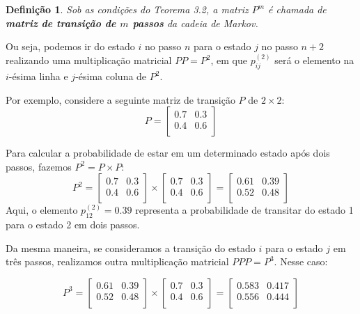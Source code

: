 \documentclass[12pt, a4paper, openany]{book}
\numberwithin{equation}{chapter}
\numberwithin{table}{chapter}
\numberwithin{figure}{chapter}
\theoremstyle{break}
\newtheorem{definition}{Defini\c{c}\~ao}[section]
\begin{document}
\begin{definition}
Sob as condições do Teorema 3.2, a matriz \( P^m \) é chamada de \textbf{matriz de transição de \( m \) passos} da cadeia de Markov.
\end{definition}

Ou seja, podemos ir do estado \( i \) no passo \( n \) para o estado \( j \) no passo \( n+2 \) realizando uma multiplicação matricial \( PP = P^2 \), em que \( p_{ij}^{(2)} \) será o elemento na \( i \)-ésima linha e \( j \)-ésima coluna de \( P^2 \). 

Por exemplo, considere a seguinte matriz de transição \( P \) de \( 2 \times 2 \):
\[
P = \begin{bmatrix}
0.7 & 0.3 \\
0.4 & 0.6 \\
\end{bmatrix}
\]

Para calcular a probabilidade de estar em um determinado estado após dois passos, fazemos \( P^2 = P \times P \):
\[
P^2 = \begin{bmatrix}
0.7 & 0.3 \\
0.4 & 0.6 \\
\end{bmatrix}
\times
\begin{bmatrix}
0.7 & 0.3 \\
0.4 & 0.6 \\
\end{bmatrix}
= \begin{bmatrix}
0.61 & 0.39 \\
0.52 & 0.48 \\
\end{bmatrix}
\]
Aqui, o elemento \( p_{12}^{(2)} = 0.39 \) representa a probabilidade de transitar do estado 1 para o estado 2 em dois passos.

Da mesma maneira, se consideramos a transição do estado \( i \) para o estado \( j \) em três passos, realizamos outra multiplicação matricial \( PPP = P^3 \). Nesse caso:

\[
P^3 = \begin{bmatrix}
0.61 & 0.39 \\
0.52 & 0.48 \\
\end{bmatrix}
\times
\begin{bmatrix}
0.7 & 0.3 \\
0.4 & 0.6 \\
\end{bmatrix}
= \begin{bmatrix}
0.583 & 0.417 \\
0.556 & 0.444 \\
\end{bmatrix}
\]
\end{document}
